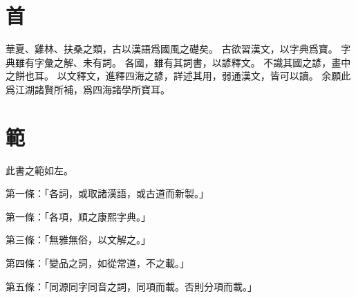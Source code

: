 \section{首}
華夏、雞林、扶桑之類，古以漢語爲國風之礎矣。
古欲習漢文，以字典爲寶。
字典雖有字彙之解、未有詞。
各國，雖有其詞書，以諺釋文。
不識其國之諺，畫中之餅也耳。
以文釋文，進釋四海之諺，詳述其用，弱通漢文，皆可以讀。
余願此爲江湖諸賢所補，爲四海諸學所寶耳。
\section{範}
此書之範如左。
\par 第一條：「各詞，或取諸漢語，或古道而新製。」
\par 第一條：「各項，順之康熙字典。」
\par 第三條：「無雅無俗，以文解之。」
\par 第四條：「變品之詞，如從常道，不之載。」
\par 第五條：「同源同字同音之詞，同項而載。否則分項而載。」
